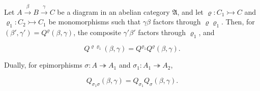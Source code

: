 Let $A \xrightarrow{\beta} B \xrightarrow{\gamma} C$ be a diagram in an abelian category $\mathfrak{A}$, and let $\varrho: C_1 \rightarrowtail C$ and $\varrho_1: C_2 \rightarrowtail C_1$ be monomorphisms such that $\gamma\beta$ factors through $\varrho\varrho_1$. Then, for $(\beta', \gamma') = Q^{\varrho}(\beta, \gamma)$, the composite $\gamma'\beta'$ factors through $\varrho_1$, and

$$Q^{\varrho\varrho_1}(\beta, \gamma) = Q^{\varrho_1}Q^{\varrho}(\beta, \gamma).$$

Dually, for epimorphisms $\sigma: A \twoheadrightarrow A_1$ and $\sigma_1: A_1 \twoheadrightarrow A_2$,

$$Q_{\sigma_1\sigma}(\beta, \gamma) = Q_{\sigma_1}Q_{\sigma}(\beta, \gamma).$$
